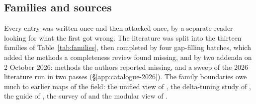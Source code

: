 \subsection{Families and sources}\label{app:catalogue-families}

Every entry was written once and then attacked once, by a separate reader looking for what the first got wrong. The
literature was split into the thirteen families of Table~\ref{tab:families}, then completed by four gap-filling
batches, which added the methods a completeness review found missing, and by two addenda on 2 October 2026: methods the authors reported missing, and a sweep of the 2026 literature run in two passes
(\S\ref{app:catalogue-2026}). The family boundaries owe much to earlier maps of the field: the unified view of
\citet{he2021unified}, the delta-tuning study of \citet{ding2022parameter}, the guide of \citet{lialin2023scaling}, the
survey of \citet{han2024parameter} and the modular view of \citet{pfeiffer2023modular}.

